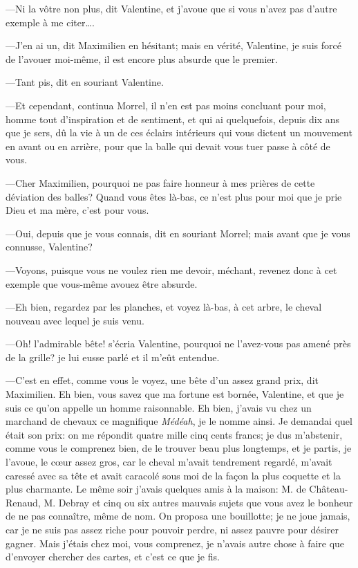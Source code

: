 —Ni la vôtre non plus, dit Valentine, et j'avoue que si vous n'avez pas d'autre exemple à me citer\dots. 

—J'en ai un, dit Maximilien en hésitant; mais en vérité, Valentine, je suis forcé de l'avouer moi-même, il est encore plus absurde que le premier. 

—Tant pis, dit en souriant Valentine. 

—Et cependant, continua Morrel, il n'en est pas moins concluant pour moi, homme tout d'inspiration et de sentiment, et qui ai quelquefois, depuis dix ans que je sers, dû la vie à un de ces éclairs intérieurs qui vous dictent un mouvement en avant ou en arrière, pour que la balle qui devait vous tuer passe à côté de vous. 

—Cher Maximilien, pourquoi ne pas faire honneur à mes prières de cette déviation des balles? Quand vous êtes là-bas, ce n'est plus pour moi que je prie Dieu et ma mère, c'est pour vous. 

—Oui, depuis que je vous connais, dit en souriant Morrel; mais avant que je vous connusse, Valentine? 

—Voyons, puisque vous ne voulez rien me devoir, méchant, revenez donc à cet exemple que vous-même avouez être absurde. 

—Eh bien, regardez par les planches, et voyez là-bas, à cet arbre, le cheval nouveau avec lequel je suis venu. 

—Oh! l'admirable bête! s'écria Valentine, pourquoi ne l'avez-vous pas amené près de la grille? je lui eusse parlé et il m'eût entendue. 

—C'est en effet, comme vous le voyez, une bête d'un assez grand prix, dit Maximilien. Eh bien, vous savez que ma fortune est bornée, Valentine, et que je suis ce qu'on appelle un homme raisonnable. Eh bien, j'avais vu chez un marchand de chevaux ce magnifique \textit{Médéah}, je le nomme ainsi. Je demandai quel était son prix: on me répondit quatre mille cinq cents francs; je dus m'abstenir, comme vous le comprenez bien, de le trouver beau plus longtemps, et je partis, je l'avoue, le cœur assez gros, car le cheval m'avait tendrement regardé, m'avait caressé avec sa tête et avait caracolé sous moi de la façon la plus coquette et la plus charmante. Le même soir j'avais quelques amis à la maison: M. de Château-Renaud, M. Debray et cinq ou six autres mauvais sujets que vous avez le bonheur de ne pas connaître, même de nom. On proposa une bouillotte; je ne joue jamais, car je ne suis pas assez riche pour pouvoir perdre, ni assez pauvre pour désirer gagner. Mais j'étais chez moi, vous comprenez, je n'avais autre chose à faire que d'envoyer chercher des cartes, et c'est ce que je fis. 

